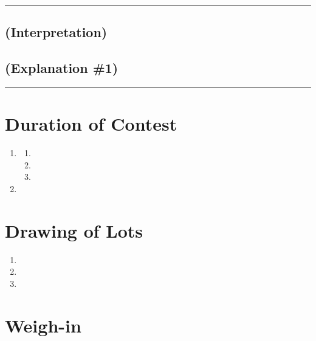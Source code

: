 \documentclass[draft]{report}
\newenvironment{expl}[0]%
  {\rule{\textwidth}{.2pt}\footnotesize}%
  {\rule{\textwidth}{.2pt}\normalsize}
\begin{document}
\begin{expl}
\section{(Interpretation)}\label{interpretation-4}


\section{(Explanation \#1)}\label{explanation-1-2}

\end{expl}


\chapter{Duration of Contest}\label{duration-of-contest}

\begin{enumerate}
\item


  \begin{enumerate}
  \item
  
  \item
  
  \item
  
  \end{enumerate}
\item

\end{enumerate}

\chapter{Drawing of Lots}\label{drawing-of-lots}

\begin{enumerate}
\item

\item

\item

\end{enumerate}

\chapter{Weigh-in}\label{weigh-in}
\end{document}
